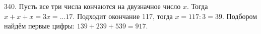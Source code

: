 340. Пусть все три числа кончаются на двузначное число $x.$ Тогда $x+x+x=3x=...17.$ Подходит окончание 117, тогда $x=117:3=39.$ Подбором найдём первые цифры: $139+239+539=917.$\\

